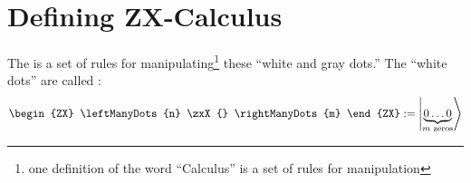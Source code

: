 \documentclass[11pt]{article}
\begin{document}
\section{Defining ZX-Calculus}

The  is a set of rules for manipulating\footnote{one definition of the word ``Calculus'' is a set of rules for manipulation} these ``white and gray dots.'' The ``white dots'' are called :
\begin{align}
    \begin{ZX}
        \leftManyDots{n} \zxX{} \rightManyDots{m}
    \end{ZX}
    :=
    \ket{\underbrace{0 \ldots 0}_{m\text{ zeros}}}
\end{align} 
\end{document}
